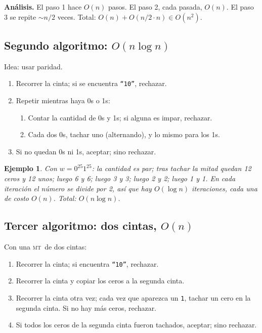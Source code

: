 \documentclass[11pt,a4paper]{article}
\theoremstyle{definicion}
\newtheorem{ejemplo}[definicion]{Ejemplo}
\newcommand{\MT}{\textsc{mt}}
\begin{document}
\textbf{An\'alisis.} El paso 1 hace $O(n)$ pasos. El paso 2, cada pasada, $O(n)$. El paso 3 se repite $\sim n/2$ veces. Total: $O(n) + O(n/2 \cdot n) \in O(n^2)$.

\subsection{Segundo algoritmo: $O(n \log n)$}

Idea: usar paridad.
\begin{enumerate}
    \item Recorrer la cinta; si se encuentra \texttt{``10''}, rechazar.
    \item Repetir mientras haya 0s o 1s:
    \begin{enumerate}
        \item Contar la cantidad de 0s y 1s; si alguna es impar, rechazar.
        \item Cada dos 0s, tachar uno (alternando), y lo mismo para los 1s.
    \end{enumerate}
    \item Si no quedan 0s ni 1s, aceptar; sino rechazar.
\end{enumerate}

\begin{ejemplo}
Con $w = 0^{25}1^{25}$: la cantidad es par; tras tachar la mitad quedan 12 ceros y 12 unos; luego 6 y 6; luego 3 y 3; luego 2 y 2; luego 1 y 1. En cada iteraci\'on el n\'umero se \emph{divide por 2}, as\'i que hay $O(\log n)$ iteraciones, cada una de costo $O(n)$. Total: $O(n \log n)$.
\end{ejemplo}

\subsection{Tercer algoritmo: dos cintas, $O(n)$}

Con una \MT\ de dos cintas:
\begin{enumerate}
    \item Recorrer la cinta; si encuentra \texttt{``10''}, rechazar.
    \item Recorrer la cinta y copiar los ceros a la segunda cinta.
    \item Recorrer la cinta otra vez; cada vez que aparezca un \texttt{1}, tachar un cero en la segunda cinta. Si no hay m\'as ceros, rechazar.
    \item Si todos los ceros de la segunda cinta fueron tachados, aceptar; sino rechazar.
\end{enumerate}
\end{document}
